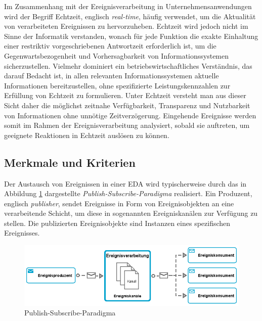 Im Zusammenhang mit der Ereignisverarbeitung in Unternehmensanwendungen wird der Begriff Echtzeit, englisch \textit{real-time}, häufig verwendet, um die Aktualität von verarbeiteten Ereignissen zu hervorzuheben.
\cite{Bruns.2015}
Echtzeit wird jedoch nicht im Sinne der Informatik verstanden, wonach für jede Funktion die exakte Einhaltung einer restriktiv vorgeschriebenen Antwortzeit erforderlich ist, um die Gegenwartsbezogenheit und Vorhersagbarkeit von Informationssystemen sicherzustellen.
Vielmehr dominiert ein betriebswirtschaftliches Verständnis, das darauf Bedacht ist, in allen relevanten Informationssystemen aktuelle Informationen bereitzustellen, ohne spezifizierte Leistungskennzahlen zur Erfüllung von Echtzeit zu formulieren.
\cite{Worn.2005}
Unter Echtzeit versteht man aus dieser Sicht daher die möglichst zeitnahe Verfügbarkeit, Transparenz und Nutzbarkeit von Informationen ohne unnötige Zeitverzögerung.
Eingehende Ereignisse werden somit im Rahmen der Ereignisverarbeitung analysiert, sobald sie auftreten, um geeignete Reaktionen in Echtzeit auslösen zu können.
\cite{Grauer.2010}

\subsection{Merkmale und Kriterien}
Der Austausch von Ereignissen in einer \ac{EDA} wird typischerweise durch das in Abbildung \ref{fig:Publish-Subscribe-Paradigma} dargestellte \textit{Publish-Subscribe-Paradigma} realisiert. 
Ein Produzent, englisch \textit{publisher}, sendet Ereignisse in Form von Ereignisobjekten an eine verarbeitende Schicht, um diese in sogenannten Ereigniskanälen zur Verfügung zu stellen. Die publizierten Ereignisobjekte sind Instanzen eines spezifischen Ereignisses. \cite{Metz.2014}

\begin{figure}[H]
	\centering 
    \includegraphics[width=\textwidth]{img/pubsub.png}	
    \caption[Publish-Subscribe-Paradigma]
    {Publish-Subscribe-Paradigma \protect\footnotemark}
    \label{fig:Publish-Subscribe-Paradigma}
\end{figure}

